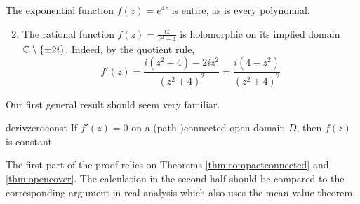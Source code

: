 
\begin{examples}{}{}
	\exstart The exponential function $f(z)=e^{4z}$ is entire, as is every polynomial.
	\begin{enumerate}\setcounter{enumi}{1}
	  \item The rational function $f(z)=\frac{iz}{z^2+4}$ is holomorphic on its implied domain $\mathbb{C}\setminus\{\pm 2i\}$. Indeed, by the quotient rule,
	  \[
	  	f'(z)=\frac{i(z^2+4)-2iz^2}{(z^2+4)^2} =\frac{i(4-z^2)}{(z^2+4)^2}
	  \]
	\end{enumerate}
\end{examples}


Our first general result should seem very familiar.

\begin{thm}{}{derivzeroconst}
	If $f'(z)=0$ on a (path-)connected open domain $D$, then $f(z)$ is constant.  
\end{thm}

The first part of the proof relies on Theorems \ref{thm:compactconnected} and \ref{thm:opencover}. The calculation in the second half should be compared to the corresponding argument in real analysis which also uses the mean value theorem.

